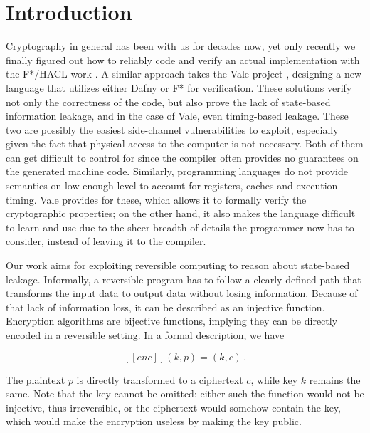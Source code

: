 \documentclass[a4paper,10pt,openright]{memoir}
\def\enc{\ensuremath{\mathit{enc}}}
\newcommand{\exe}[1]{\ensuremath{[\![#1]\!]}}
\begin{document}
\chapter{Introduction}


Cryptography in general has been with us for decades now, yet only 
recently we finally figured out how to reliably code and verify an 
actual implementation with the F*/HACL work \cite{ProtzenkoEtal:2017}. 
A similar approach takes the Vale project \cite{BondEtal:2017:Vale}, 
designing a new language that utilizes either Dafny or F* for 
verification. These solutions verify not only the correctness of the 
code, but also prove the lack of state-based information leakage, and 
in the case of Vale, even timing-based leakage. These two are possibly 
the easiest side-channel vulnerabilities to exploit, especially given 
the fact that physical access to the computer is not necessary. Both of 
them can get difficult to control for since the compiler often provides 
no guarantees on the generated machine code. Similarly, programming 
languages do not provide semantics on low enough level to account for 
registers, caches and execution timing. Vale provides for these, which 
allows it to formally verify the cryptographic properties; on the other 
hand, it also makes the language difficult to learn and use due to the 
sheer breadth of details the programmer now has to consider, instead of 
leaving it to the compiler.

Our work aims for exploiting reversible computing to reason about 
state-based leakage. Informally, a reversible program has to follow a 
clearly defined path that transforms the input data to output data 
without losing information. Because of that lack of information loss, 
it can be described as an injective function. Encryption algorithms are 
bijective functions, implying they can be directly encoded in a 
reversible setting. In a formal description, we have

$$
\exe{\enc}(k,p) = (k,c) \,.
$$

The plaintext $p$ is directly transformed to a ciphertext $c$, while 
key $k$ remains the same. Note that the key cannot be omitted: either 
such the function would not be injective, thus irreversible, or the 
ciphertext would somehow contain the key, which would make the 
encryption useless by making the key public. 
\end{document}
